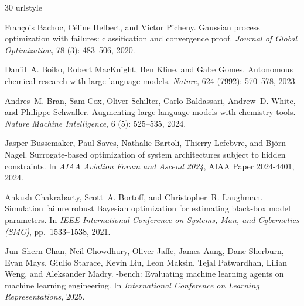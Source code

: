\documentclass{article} %
\begin{document}
\begin{thebibliography}{30}
\providecommand{\natexlab}[1]{#1}
\providecommand{\url}[1]{\texttt{#1}}
\expandafter\ifx\csname urlstyle\endcsname\relax
  \providecommand{\doi}[1]{doi: #1}\else
  \providecommand{\doi}{doi: \begingroup \urlstyle{rm}\Url}\fi

Fran{\c c}ois Bachoc, C{\'e}line Helbert, and Victor Picheny.
\newblock Gaussian process optimization with failures: classification and convergence proof.
\newblock \emph{Journal of Global Optimization}, 78 (3): 483--506, 2020.

Daniil~A. Boiko, Robert MacKnight, Ben Kline, and Gabe Gomes.
\newblock Autonomous chemical research with large language models.
\newblock \emph{Nature}, 624 (7992): 570--578, 2023.

Andres~M. Bran, Sam Cox, Oliver Schilter, Carlo Baldassari, Andrew~D. White, and Philippe Schwaller.
\newblock Augmenting large language models with chemistry tools.
\newblock \emph{Nature Machine Intelligence}, 6 (5): 525--535, 2024.

Jasper Bussemaker, Paul Saves, Nathalie Bartoli, Thierry Lefebvre, and Bj{\"o}rn Nagel.
\newblock Surrogate-based optimization of system architectures subject to hidden constraints.
\newblock In \emph{AIAA Aviation Forum and Ascend 2024}, AIAA Paper 2024-4401, 2024.

Ankush Chakrabarty, Scott~A. Bortoff, and Christopher~R. Laughman.
\newblock Simulation failure robust {Bayesian} optimization for estimating black-box model parameters.
\newblock In \emph{IEEE International Conference on Systems, Man, and Cybernetics (SMC)}, pp.\  1533--1538, 2021.

Jun~Shern Chan, Neil Chowdhury, Oliver Jaffe, James Aung, Dane Sherburn, Evan Mays, Giulio Starace, Kevin Liu, Leon Maksin, Tejal Patwardhan, Lilian Weng, and Aleksander Madry.
-bench: Evaluating machine learning agents on machine learning engineering.
\newblock In \emph{International Conference on Learning Representations}, 2025.


\end{thebibliography}
\end{document}
